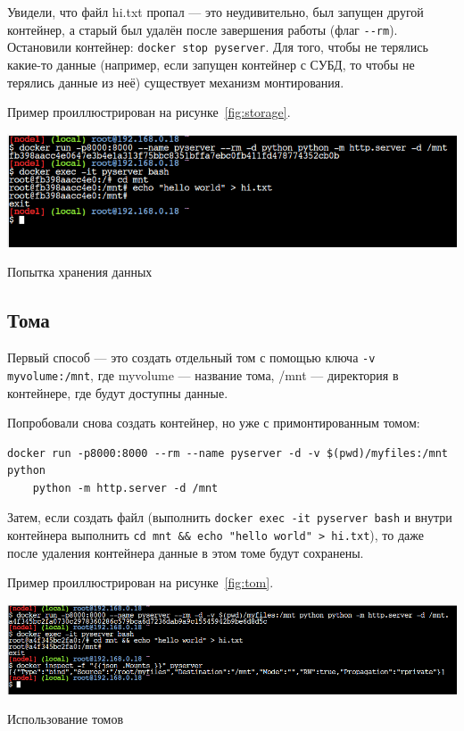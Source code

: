 Увидели, что файл hi.txt пропал --- это неудивительно, был запущен
другой контейнер, а старый был удалён после завершения работы
(флаг \verb|--rm|).
Остановили контейнер: \texttt{docker stop pyserver}.
Для того, чтобы не терялись какие-то данные
(например, если запущен контейнер с СУБД, то чтобы
не терялись данные из неё) существует механизм монтирования.\par
Пример проиллюстрирован на рисунке~\ref{fig:storage}.

\begin{image}
	\includegraphics[width=1\textwidth]{Screenshot from 2023-04-15 15-51-10}
	\caption{Попытка хранения данных}
	\label{fig:storage}
\end{image}

\subsection{Тома}
Первый способ --- это создать отдельный том с помощью ключа
\texttt{-v myvolume:/mnt}, где myvolume --- название тома,
/mnt --- директория в контейнере, где будут доступны данные.\par
Попробовали снова создать контейнер, но уже с примонтированным томом:

\begin{verbatim}
docker run -p8000:8000 --rm --name pyserver -d -v $(pwd)/myfiles:/mnt python
	python -m http.server -d /mnt
\end{verbatim}

Затем, если создать файл (выполнить \texttt{docker exec -it pyserver bash}
и внутри контейнера выполнить \verb|cd mnt && echo "hello world" > hi.txt|),
то даже после удаления контейнера данные в этом томе будут сохранены.\par
Пример проиллюстрирован на рисунке~\ref{fig:tom}.

\begin{image}
	\includegraphics[width=1\textwidth]{Screenshot from 2023-04-15 16-13-18}
	\caption{Использование томов}
	\label{fig:tom}
\end{image}

